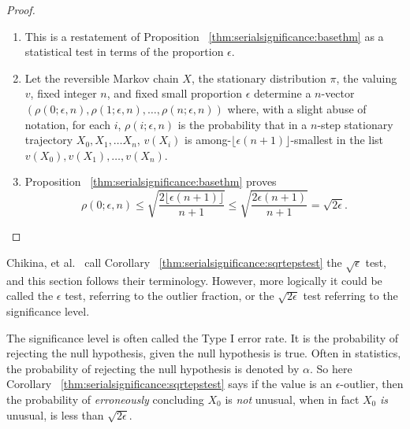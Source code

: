 \documentclass[12pt]{article}
\begin{document}
\begin{proof}
    \begin{enumerate}
        \item
            This is a restatement of Proposition~%
            \ref{thm:serialsignificance:basethm} as a statistical test in
            terms of the proportion \( \epsilon \).
        \item
            Let the reversible Markov chain \( X \), the stationary
            distribution \( \pi \), the valuing \( v \), fixed integer \(
            n \), and fixed small proportion \( \epsilon \) determine a \(
            n \)-vector \( (\rho(0; \epsilon, n), \rho(1; \epsilon, n),
            \dots, \rho(n; \epsilon, n)) \) where, with a slight abuse
            of notation, for each \( i \), \( \rho(i; \epsilon, n) \) is
            the probability that in a \( n \)-step stationary trajectory
            \( X_0, X_1, \dots X_n \), \( v(X_i) \) is among-\( \lfloor
            \epsilon(n+1) \rfloor \)-smallest in the list \( v(X_0), v(X_1),
            \dots, v(X_n) \).
        \item
            Proposition~%
            \ref{thm:serialsignificance:basethm} proves
            \[
                \rho(0; \epsilon, n) \le \sqrt{\frac{2 \lfloor \epsilon
                (n+1) \rfloor}{n+1}} \le \sqrt{\frac{2 \epsilon (n+1)}{n+1}}
                = \sqrt{2\epsilon}.
            \]
    \end{enumerate}
\end{proof}

\begin{remark}
    Chikina, et al.~%
    \cite{Chikina2860} call Corollary~%
    \ref{thm:serialsignificance:sqrtepstest} the \( \sqrt{\epsilon} \) test,
    and this section follows their terminology.  However, more logically
    it could be called the \( \epsilon \) test, referring to the outlier
    fraction, or the \( \sqrt{2 \epsilon} \) test referring to the
    significance level.
\end{remark}

\begin{remark}
    The significance level is often called the Type I error rate.%
    It is the probability of rejecting the null hypothesis, given the
    null hypothesis is true.  Often in statistics, the probability of
    rejecting the null hypothesis is denoted by \( \alpha \).  So here
    Corollary~%
    \ref{thm:serialsignificance:sqrtepstest} says if the value is an \(
    \epsilon \)-outlier, then the probability of \emph{erroneously}
    concluding \( X_0 \) is \emph{not} unusual, when in fact \( X_0 \) \emph{is}
    unusual, is less than \( \sqrt{2 \epsilon } \).
\end{remark}
\end{document}
